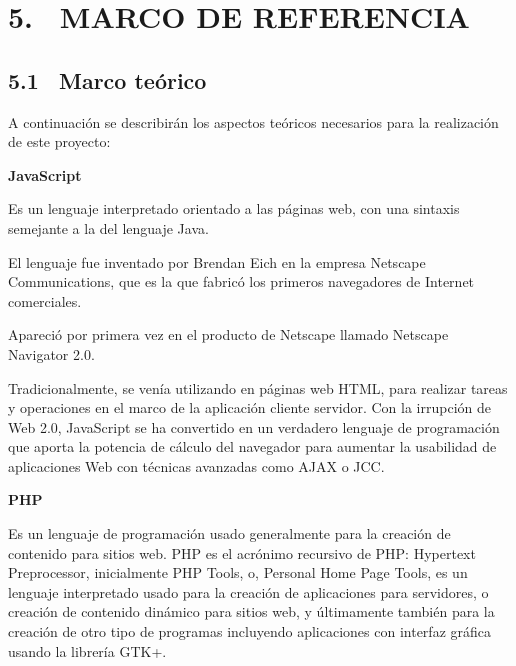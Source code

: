 \documentclass[12pt,letterpaper,oneside]{article}
\begin{document}
\bigskip


\bigskip


\bigskip


\bigskip


\bigskip


\bigskip


\bigskip


\bigskip


\bigskip

\section[5. \ MARCO DE REFERENCIA]{5. \ MARCO DE REFERENCIA}

\bigskip

\subsection[5.1 \ Marco teórico]{5.1 \ Marco teórico}

\bigskip

A continuación se describirán los aspectos teóricos necesarios
para la realización de este proyecto:


\bigskip

{\bfseries
JavaScript}

Es un lenguaje interpretado orientado a las páginas web, con una
sintaxis semejante a la del lenguaje Java.

El lenguaje fue inventado por Brendan Eich en la empresa Netscape
Communications, que es la que fabricó los primeros navegadores de
Internet comerciales.

Apareció por primera vez en el producto de Netscape llamado Netscape
Navigator 2.0.

Tradicionalmente, se venía utilizando en páginas web HTML, para
realizar tareas y operaciones en el marco de la aplicación cliente
servidor. Con la irrupción de Web 2.0, JavaScript se ha convertido en
un verdadero lenguaje de programación que aporta la potencia de
cálculo del navegador para aumentar la usabilidad de aplicaciones Web
con técnicas avanzadas como AJAX o JCC.


\bigskip

{\bfseries
PHP}

Es un lenguaje de programación usado generalmente para la creación
de contenido para sitios web. PHP es el acrónimo recursivo de
{\textquotedbl}PHP: Hypertext Preprocessor{\textquotedbl}, inicialmente
PHP Tools, o, Personal Home Page Tools, es un lenguaje interpretado
usado para la creación de aplicaciones para servidores, o creación
de contenido dinámico para sitios web, y últimamente también para
la creación de otro tipo de programas incluyendo aplicaciones con
interfaz gráfica usando la librería GTK+.
\end{document}
